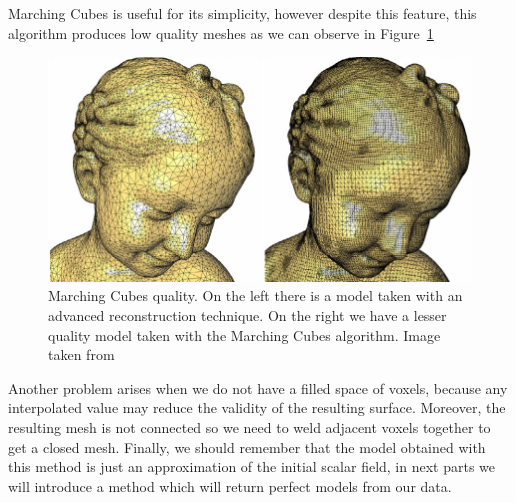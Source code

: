 Marching Cubes is useful for its simplicity, however despite this feature, this algorithm produces low quality meshes as we can observe in Figure~\ref{fig:MarchingQuality}

\begin{figure}[htb] %
   \centering
   \includegraphics[width=0.50\linewidth]{images/MarchingCubeComparison.png}
   \caption[Marching Cubes quality]{Marching Cubes quality. On the left there is a model taken with an advanced reconstruction technique. On the right we have a lesser quality model taken with the Marching Cubes algorithm. Image taken from \cite{Alliez}}
   \label{fig:MarchingQuality}
\end{figure}

Another problem arises when we do not have a filled space of voxels, because any interpolated value may reduce the validity of the resulting surface. Moreover, the resulting mesh is not connected so we need to weld adjacent voxels together to get a closed mesh. Finally, we should remember that the model obtained with this method is just an approximation of the initial scalar field, in next parts we will introduce a method which will return perfect models from our data.